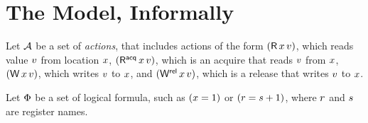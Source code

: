 \section{The Model,  Informally}
\label{sec:model:intro}

\begin{comment}
https://preshing.com/20131125/acquire-and-release-fences-dont-work-the-way-youd-expect/

Cannot encode R/A actions with actions+fences...

A release operation prevents preceding memory operations from being delayed
past it (a;Rel =/=> Rel;a)
 
A release fence prevents preceding memory operations from being delayed past
subsequent writes (a;FR;w =/=> w;a;FR)

An acquire operation prevents subsequent memory operations from being advanced
before it (Acq;a =/=> a;Acq)

An acquire fence prevents subsequent memory operations from being advanced
before prior reads (r;FA;a =/=> FA;a;r)

https://www.modernescpp.com/index.php/fences-as-memory-barriers

StoreLoad: Full fence allows a store before to be reordered with respect to a
load after (wx;F;ry) ===> (ry;F;wx)

StoreLoad+LoadLoad: Release fence also allows (rx;FR;ry) ===> (ry;FR;rx)

StoreLoad+StoreStore: Acquire fence also allows (wx;FR;wy) ===> (wy;FR;wx)

LoadStore: No fence allows a prior load to reorder w.r.t. a subsequent store
(rx;FR;wy) =/=> (wy;FR;rx)

https://preshing.com/20120710/memory-barriers-are-like-source-control-operations/
Good news is that a fullFence does it.

Bizarrely, it seems this is not supported in C++... You have to go to assembly.
\end{comment}


Let $\mathcal{A}$ be a set of \emph{actions}, that includes actions of the form
$(\DR{\aLoc}{\aVal})$, which reads value $v$ from location $x$,
$(\DRAcq{\aLoc}{\aVal})$, which is an acquire that reads $v$ from
$x$, $(\DW{\aLoc}{\aVal})$, which writes $v$ to $x$, and
$(\DWRel{\aLoc}{\aVal})$, which is a release that writes $v$ to $x$.

Let $\Phi$ be a set of logical formula, such as $(x=1)$ or
$(r=s+1)$, where $r$ and $s$ are register names.

